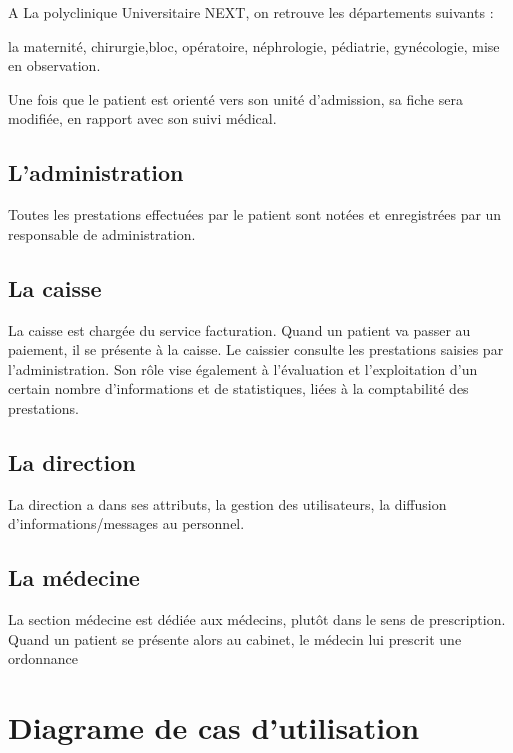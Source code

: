A La polyclinique Universitaire NEXT, on retrouve les départements suivants :

la maternité, chirurgie,bloc, opératoire,        néphrologie,  pédiatrie, gynécologie, mise en observation.

Une fois que le patient est orienté vers son unité d'admission, sa fiche sera modifiée, en
rapport avec son suivi médical.


\subsection{L'administration}

Toutes les prestations effectuées par le patient sont notées et enregistrées par un
responsable de administration.


\subsection{La caisse}
La caisse est chargée du service facturation. Quand un patient va passer au paiement, il se
présente à la caisse. Le caissier consulte les prestations saisies par l'administration.
Son rôle vise également à l'évaluation et l'exploitation d'un certain nombre d'informations
et de statistiques, liées à la comptabilité des prestations.

\subsection{La direction}
La direction a dans ses attributs, la gestion des utilisateurs, la diffusion
d'informations/messages au personnel.

\subsection{La médecine}

La section médecine est dédiée aux médecins, plutôt dans le sens de prescription. Quand un
patient se présente alors au cabinet, le médecin lui prescrit une ordonnance









	\newpage
	
	
	
	
	
	
	
	
	
	
	
	\section{Diagrame de cas d'utilisation}
	
